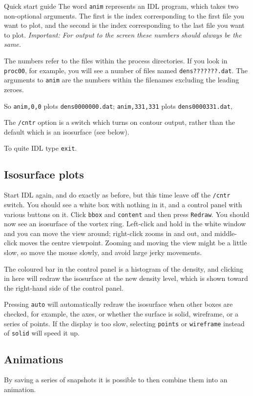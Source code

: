 \begin{chapter}{\label{cha:quickstart} Quick start guide}
  The word \verb"anim" represents an IDL program, which takes two non-optional
  arguments.  The first is the index corresponding to the first file you want
  to plot, and the second is the index corresponding to the last file you want
  to plot.  \emph{Important: For output to the screen these numbers should
  always be the same.}

  The numbers refer to the files within the process directories.  If you look
  in \verb"proc00", for example, you will see a number of files named
  \verb"dens???????.dat".  The arguments to \verb"anim" are the numbers within
  the filenames excluding the leading zeroes.

  So \verb"anim,0,0" plots \verb"dens0000000.dat"; \verb"anim,331,331" plots
  \verb"dens0000331.dat", \etc

  The \verb"/cntr" option is a switch which turns on contour output, rather
  than the default which is an isosurface (see below).

  To quite IDL type \verb"exit".

  \subsection{Isosurface plots}
  Start IDL again, and do exactly as before, but this time leave off the
  \verb"/cntr" switch.  You should see a white box with nothing in it, and a
  control panel with various buttons on it.  Click \verb"bbox" and
  \verb"content" and then press \verb"Redraw".  You should now see an
  isosurface of the vortex ring.  Left-click and hold in the white window and
  you can move the view around; right-click zooms in and out, and middle-click
  moves the centre viewpoint.  Zooming and moving the view might be a little
  slow, so move the mouse slowly, and avoid large jerky movements.

  The coloured bar in the control panel is a histogram of the density, and
  clicking in here will redraw the isosurface at the new density level, which
  is shown toward the right-hand side of the control panel.

  Pressing \verb"auto" will automatically redraw the isosurface when other
  boxes are checked, for example, the axes, or whether the surface is solid,
  wireframe, or a series of points.  If the display is too slow, selecting
  \verb"points" or \verb"wireframe" instead of \verb"solid" will speed it up.

  \subsection{Animations}
  By saving a series of snapshots it is possible to then combine them into an
  animation.


\end{chapter}
